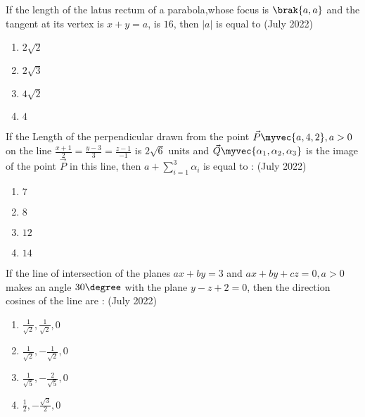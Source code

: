     \item If the length of the latus rectum of a parabola,whose focus is $\brak{a,a}$ and the tangent at its vertex is $x+y = a$, is $16$, then $|a|$ is equal to 
    \hfill(July 2022)
    \begin{enumerate}
        \item $2\sqrt{2}$
        \item $2\sqrt{3}$
        \item $4\sqrt{2}$
        \item $4$
    \end{enumerate}


    \item If the Length of the perpendicular drawn from the point $\vec{P} \myvec{a,4,2} , a > 0$ on the line $\frac{x+1}{2} = \frac{y-3}{3} = \frac{z-1}{-1}$ is $2\sqrt{6}$ units and $\vec{Q} \myvec{\alpha_{1},\alpha_{2},\alpha_{3}}$ is the image of the point $\vec{P}$ in this line, then $a + \sum_{i=1}^{3} \alpha_{i}$ is equal to :
    \hfill(July 2022)
    \begin{enumerate}
        \item $7$
        \item $8$
        \item $12$
        \item $14$
    \end{enumerate}

    \item If the line of intersection of the planes $ax+by=3$ and $ax+by+cz=0 , a>0$ makes an angle $30\degree$ with the plane $y-z+2=0$, then the direction cosines of the line are :
    \hfill(July 2022)
    \begin{enumerate}
        \item $\frac{1}{\sqrt{2}} , \frac{1}{\sqrt{2}}, 0$
        \item $\frac{1}{\sqrt{2}} , -\frac{1}{\sqrt{2}}, 0$
        \item $\frac{1}{\sqrt{5}} , -\frac{2}{\sqrt{5}}, 0$
        \item $\frac{1}{2} , -\frac{\sqrt{3}}{2}, 0$
    \end{enumerate}


